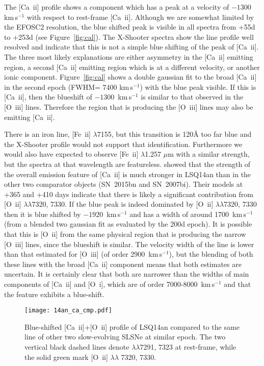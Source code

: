 \documentclass[useAMS,usenatbib]{mn2e}
\def\kms{km\,s$^{-1}$}
\def\an{LSQ14an}
\def\oiii{[O~{\sc iii}]}
\begin{document}
The  [Ca~{\sc ii}] profile shows a component which has a peak at a velocity of $-1300$ \kms\/
with respect to rest-frame [Ca~{\sc ii}]. Although we are somewhat limited by the EFOSC2 resolution, the 
blue shifted peak is visible in all spectra from +55d to +253d (see Figure~\ref{fig:cal}). 
The X-Shooter spectra show the line profile well resolved and indicate that this is not a
simple blue shifting of the peak of [Ca~{\sc ii}]. The three most likely explanations are 
either asymmetry in the [Ca~{\sc ii}] emitting region, a second [Ca~{\sc ii}] emitting region which is at a different velocity, 
or another ionic component.  
Figure~\ref{fig:cal} shows a double gaussian fit to the 
broad [Ca~{\sc ii}] in the second epoch (FWHM= 7400 \kms\/) with the blue peak visible. 
If this is [Ca~{\sc ii}], then the blueshift of $-1300$~\kms\/ is similar to that observed in the \oiii\/ lines. 
Therefore the region that is producing the  \oiii\/ lines may also be emitting [Ca~{\sc ii}]. 

There is an iron line, [Fe~{\sc ii}] $\lambda$7155, but this transition is 120\AA\/ too far blue and 
the X-Shooter profile would not support that identification. Furthermore we would also have expected to observe [Fe~{\sc ii}] $\lambda$1.257 $\mu$m with a similar strength, but the spectra at that wavelength are featureless. 
\cite{je16} showed that the strength of the overall emission feature of [Ca~{\sc ii}]  is much stronger in LSQ14an than in the other two comparator objects (SN~2015bn and SN~2007bi). Their models at +365 and +410 days indicate that there is likely a 
significant contribution from  [O~{\sc ii}] $\lambda\lambda$7320, 7330. If the blue peak  is indeed dominated by
[O~{\sc ii}] $\lambda\lambda$7320, 7330 then it is blue shifted by $-1920$~\kms\/ and has a width of around 1700~\kms\/ (from a 
blended two gaussian fit as evaluated by the 200d epoch). It is possible that this is [O~{\sc ii}]  from the same physical region that is producing the narrow  [O~{\sc iii}] lines, since the blueshift is similar. The velocity width of the line is lower than that estimated for 
[O~{\sc iii}] (of order 2900~\kms), but the blending of both these lines with the broad [Ca~{\sc ii}] component means that both estimates are uncertain. It is certainly clear that both are
narrower than the widths of main components of [Ca~{\sc ii}] and [O~{\sc i}], which are of order 7000-8000~\kms\/ and that the feature exhibits a blue-shift.

\begin{figure}
\texttt{[image: 14an\_ca\_cmp.pdf]}
\caption{Blue-shifted [Ca~{\sc ii}]+[O~{\sc ii}] profile of \an\/ compared to the same line of other two slow-evolving SLSNe at similar epoch. The two vertical black dashed lines denote $\lambda\lambda$7291, 7323 at rest-frame, while the solid green mark [O~{\sc ii}] $\lambda\lambda$ 7320, 7330.}
\label{fig:cac}
\end{figure}
\end{document}
